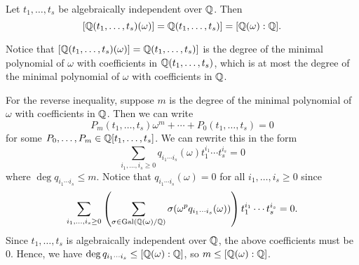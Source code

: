 \begin{lemma}{}
    Let $t_1, \dots, t_s$ be algebraically independent over $\mathbb{Q}$. Then 
    \[ [\mathbb{Q}(t_1, \dots, t_s)(\omega)] = \mathbb{Q}(t_1, \dots, t_s)] = 
    [\mathbb{Q}(\omega) : \mathbb{Q}]. \] 
\end{lemma}
\begin{pf}
    Notice that $[\mathbb{Q}(t_1, \dots, t_s)(\omega)] = \mathbb{Q}(t_1, \dots, t_s)]$ 
    is the degree of the minimal polynomial of $\omega$ with coefficients 
    in $\mathbb{Q}(t_1, \dots, t_s)$, which is at most the degree of the minimal 
    polynomial of $\omega$ with coefficients in $\mathbb{Q}$. 

    For the reverse inequality, suppose $m$ is the degree of the minimal 
    polynomial of $\omega$ with coefficients in $\mathbb{Q}$. Then we can write 
    \[ P_m(t_1, \dots, t_s) \omega^m + \cdots + P_0(t_1, \dots, t_s) = 0 \] 
    for some $P_0, \dots, P_m \in \mathbb{Q}[t_1, \dots, t_s]$. We can rewrite this 
    in the form 
    \[ \sum_{i_1,\dots,i_s \geq 0} q_{i_1\cdots i_s}(\omega) t_1^{i_1} 
    \cdots t_s^{i_s} = 0 \] 
    where $\deg q_{i_1\cdots i_s} \leq m$. Notice that 
    $q_{i_1\cdots i_s}(\omega) = 0$ for all $i_1, \dots, i_s \geq 0$ since 
    \[ \sum_{i_1,\dots, i_s \geq 0} 
    \left( \sum_{\sigma \in \operatorname{Gal}(\mathbb{Q}(\omega)/\mathbb{Q})} \sigma(\omega^p 
    q_{i_1\cdots i_s}(\omega)) \right) t_1^{i_1} \cdots t_s^{i_s} = 0. \] 
    Since $t_1, \dots, t_s$ is algebraically independent over $\mathbb{Q}$, the 
    above coefficients must be $0$. Hence, we have $\deg q_{i_1\cdots i_s} \leq
    [\mathbb{Q}(\omega) : \mathbb{Q}]$, so $m \leq [\mathbb{Q}(\omega) : \mathbb{Q}]$. 
\end{pf}
